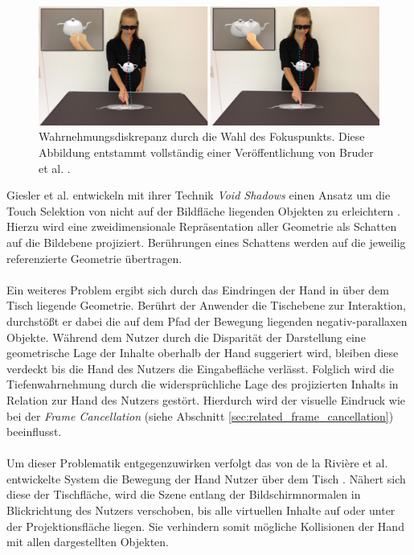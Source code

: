 \begin{figure}
	\begin{center}
		\includegraphics[width=12cm]{img/fokussierung.pdf}
	\end{center}
	\caption{Wahrnehmungsdiskrepanz durch die Wahl des Fokuspunkts. Diese Abbildung entstammt vollständig einer Veröffentlichung von Bruder et al. \cite{bruder:2013}.}
	\label{fig:fokussierung}
\end{figure}

Giesler et al. entwickeln mit ihrer Technik \emph{Void Shadows} einen Ansatz um die Touch Selektion von nicht auf der Bildfläche liegenden Objekten zu erleichtern \cite{giesler:2014}. Hierzu wird eine zweidimensionale Repräsentation aller Geometrie als Schatten auf die Bildebene projiziert. Berührungen eines Schattens werden auf die jeweilig referenzierte Geometrie übertragen.
\\\\
Ein weiteres Problem ergibt sich durch das Eindringen der Hand in über dem Tisch liegende Geometrie. Berührt der Anwender die Tischebene zur Interaktion, durchstößt er dabei die auf dem Pfad der Bewegung liegenden negativ-parallaxen Objekte. Während dem Nutzer durch die Disparität der Darstellung eine geometrische Lage der Inhalte oberhalb der Hand suggeriert wird, bleiben diese verdeckt bis die Hand des Nutzers die Eingabefläche verlässt. Folglich wird die Tiefenwahrnehmung durch die widersprüchliche Lage des projizierten Inhalts in Relation zur Hand des Nutzers gestört. Hierdurch wird der visuelle Eindruck wie bei der \emph{Frame Cancellation} (siehe Abschnitt \ref{sec:related_frame_cancellation}) beeinflusst.
\\\\
Um dieser Problematik entgegenzuwirken verfolgt das von de la Rivière et al. entwickelte System die Bewegung der Hand Nutzer über dem Tisch \cite{delariviere:2010}. Nähert sich diese der Tischfläche, wird die Szene entlang der Bildschirmnormalen in Blickrichtung des Nutzers verschoben, bis alle virtuellen Inhalte auf oder unter der Projektionsfläche liegen. Sie verhindern somit mögliche Kollisionen der Hand mit allen dargestellten Objekten.


